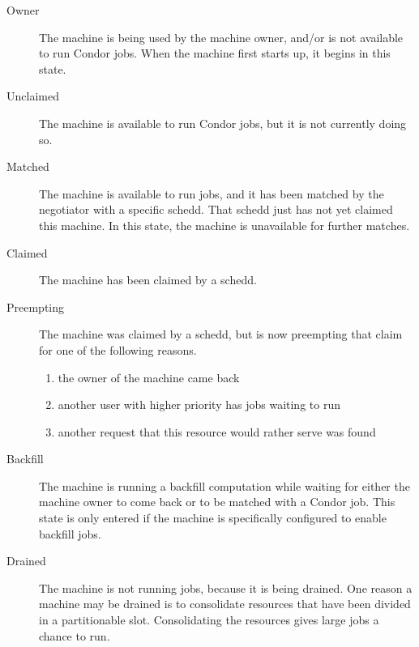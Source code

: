 \begin{description}
  
\item[Owner] The machine is being used by the machine owner, and/or
  is not available to run Condor jobs.
  When the machine first starts up, it begins in this state.
  
\item[Unclaimed] The machine is available to run Condor jobs, but it is
  not currently doing so.
  
\item[Matched] The machine is available to run jobs, and it has been
  matched by the negotiator with a specific schedd.
  That schedd just has not yet claimed this machine.
  In this state, the machine is unavailable for further matches.

\item[Claimed] The machine has been claimed by a schedd. 
  
\item[Preempting] The machine was claimed by a schedd, but is now
  preempting that claim for one of the following reasons.
  \begin{enumerate}
  \item the owner of the machine came back
  \item another user with higher priority has jobs waiting to run
  \item another request that this resource would rather serve was found
  \end{enumerate}

\item[Backfill] The machine is running a backfill computation while
  waiting for either the machine owner to come back or to be matched
  with a Condor job.
  This state is only entered if the machine is specifically configured
  to enable backfill jobs.

\item[Drained] The machine is not running jobs, because it is being
  drained.  One reason a machine may be drained is to consolidate
  resources that have been divided in a partitionable slot.
  Consolidating the resources gives large jobs a chance to run.

\end{description}

